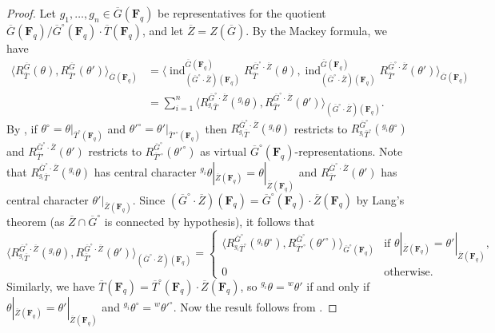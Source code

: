 \documentclass[reqno]{amsart}
\numberwithin{equation}{subsection}
\newcommand{\F}{\mathbf{F}}
\newcommand{\ol}[1]{\overline{#1}}
\DeclareMathOperator{\ind}{ind}
\theoremstyle{remark}
\numberwithin{equation}{subsection}
\numberwithin{figure}{subsection}
\begin{document}
\begin{proof}
    Let $g_1, \dots, g_n \in \ol G(\F_q)$ be representatives for the quotient $\ol G(\F_q)/\ol G^\circ(\F_q) \cdot \ol T(\F_q)$, and let $\ol Z = Z(\ol G)$. By the Mackey formula, we have
    \begin{align*}
        \langle R_{\ol T}^{\ol G}(\theta), R_{\ol T'}^{\ol G}(\theta')\rangle_{\ol G(\F_q)} &= \langle \ind_{(\ol G^\circ \cdot \ol Z)(\F_q)}^{\ol G(\F_q)} R_{\ol T}^{\ol G^\circ \cdot \ol Z}(\theta), \ind_{(\ol G^\circ \cdot \ol Z)(\F_q)}^{\ol G(\F_q)} R_{\ol T'}^{\ol G^\circ \cdot \ol Z}(\theta')\rangle_{\ol G(\F_q)} \\
            &= \sum_{i=1}^n \langle R_{{}^{g_i}\ol T}^{\ol G^\circ \cdot \ol Z}({}^{g_i}\theta), R_{\ol T'}^{\ol G^\circ \cdot \ol Z}(\theta')\rangle_{(\ol G^\circ \cdot \ol Z)(\F_q)}.
    \end{align*}
    By \cite[Remark 2.6.5]{Kal21b}, if $\theta^\circ = \theta|_{\ol T^\circ(\F_q)}$ and $\theta'^\circ = \theta'|_{\ol T'^\circ(\F_q)}$ then $R_{{}^{g_i}\ol T}^{\ol G^\circ \cdot \ol Z}({}^{g_i}\theta)$ restricts to $R_{{}^{g_i}\ol T^\circ}^{\ol G^\circ}({}^{g_i}\theta^\circ)$ and $R_{\ol T'}^{\ol G^\circ \cdot \ol Z}(\theta')$ restricts to $R_{\ol T'^\circ}^{\ol G^\circ}(\theta'^\circ)$ as virtual $\ol G^\circ(\F_q)$-representations. Note that $R_{{}^{g_i}\ol T}^{\ol G^\circ \cdot \ol Z}({}^{g_i}\theta)$ has central character ${}^{g_i}\theta|_{\ol Z(\F_q)} = \theta|_{\ol Z(\F_q)}$ and $R_{\ol T'}^{\ol G^\circ \cdot \ol Z}(\theta')$ has central character $\theta'|_{\ol Z(\F_q)}$. Since $(\ol G^\circ \cdot \ol Z)(\F_q) = \ol G^\circ(\F_q) \cdot \ol Z(\F_q)$ by Lang's theorem (as $\ol Z \cap \ol G^\circ$ is connected by hypothesis), it follows that
    \[
    \langle R_{{}^{g_i}\ol T}^{\ol G^\circ \cdot \ol Z}({}^{g_i}\theta), R_{\ol T'}^{\ol G^\circ \cdot \ol Z}(\theta')\rangle_{(\ol G^\circ \cdot \ol Z)(\F_q)} = \begin{cases}
        \langle R_{{}^{g_i}\ol T^\circ}^{\ol G^\circ}({}^{g_i}\theta^\circ), R_{\ol T'^\circ}^{\ol G^\circ}(\theta'^\circ)\rangle_{\ol G^\circ(\F_q)} &\text{if } \theta|_{\ol Z(\F_q)} = \theta'|_{\ol Z(\F_q)}, \\
        0 &\text{otherwise.}
    \end{cases}
    \]
    Similarly, we have $\ol T(\F_q) = \ol T^\circ(\F_q) \cdot \ol Z(\F_q)$, so ${}^{g_i}\theta = {}^w\theta'$ if and only if $\theta|_{\ol Z(\F_q)} = \theta'|_{\ol Z(\F_q)}$ and ${}^{g_i}\theta^\circ = {}^w\theta'^\circ$. Now the result follows from \cite[Theorem~6.8]{DL76}.
\end{proof}
\end{document}
